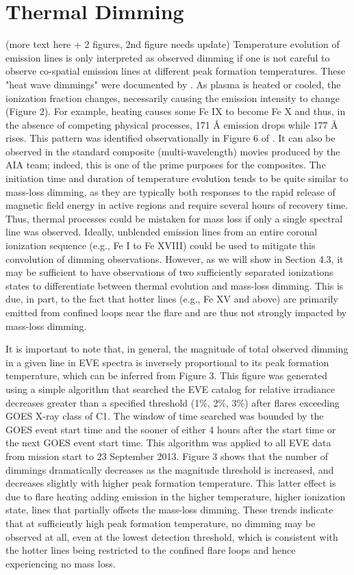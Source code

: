 \section{Thermal Dimming}
(more text here + 2 figures, 2nd figure needs update)
Temperature evolution of emission lines is only interpreted as observed dimming if one is not careful to observe co-spatial emission lines at different peak formation temperatures. These "heat wave dimmings" were documented by   \citet{Robbrecht2010}. As plasma is heated or cooled, the ionization fraction changes, necessarily causing the emission intensity to change (Figure 2). For example, heating causes some Fe IX to become Fe X and thus, in the absence of competing physical processes, 171 Å emission drops while 177 Å rises. This pattern was identified observationally in Figure 6 of \citet{Woods2011}. It can also be observed in the standard composite (multi-wavelength) movies produced by the AIA team; indeed, this is one of the prime purposes for the composites. The initiation time and duration of temperature evolution tends to be quite similar to mass-loss dimming, as they are typically both responses to the rapid release of magnetic field energy in active regions and require several hours of recovery time. Thus, thermal processes could be mistaken for mass loss if only a single spectral line was observed. Ideally, unblended emission lines from an entire coronal ionization sequence (e.g., Fe I to Fe XVIII) could be used to mitigate this convolution of dimming observations. However, as we will show in Section 4.3, it may be sufficient to have observations of two sufficiently separated ionizations states to differentiate between thermal evolution and mass-loss dimming. This is due, in part, to the fact that hotter lines (e.g., Fe XV and above) are primarily emitted from confined loops near the flare and are thus not strongly impacted by mass-loss dimming. 

It is important to note that, in general, the magnitude of total observed dimming in a given line in EVE spectra is inversely proportional to its peak formation temperature, which can be inferred from Figure 3. This figure was generated using a simple algorithm that searched the EVE catalog for relative irradiance decreases greater than a specified threshold (1\%, 2\%, 3\%) after flares exceeding GOES X-ray class of C1. The window of time searched was bounded by the GOES event start time and the sooner of either 4 hours after the start time or the next GOES event start time. This algorithm was applied to all EVE data from mission start to 23 September 2013. Figure 3 shows that the number of dimmings dramatically decreases as the magnitude threshold is increased, and decreases slightly with higher peak formation temperature. This latter effect is due to flare heating adding emission in the higher temperature, higher ionization state, lines that partially offsets the mass-loss dimming. These trends indicate that at sufficiently high peak formation temperature, no dimming may be observed at all, even at the lowest detection threshold, which is consistent with the hotter lines being restricted to the confined flare loops and hence experiencing no mass loss. 

